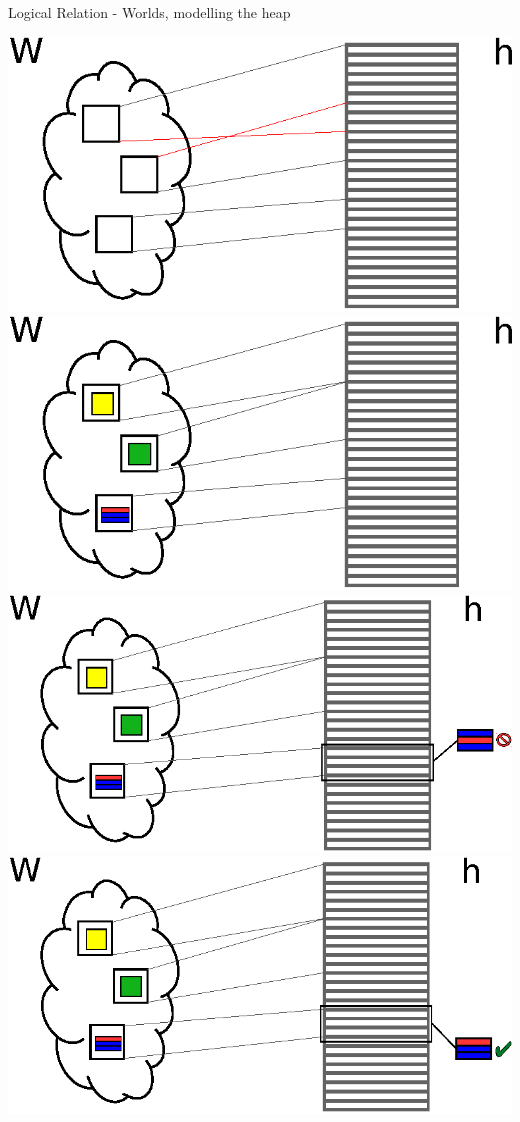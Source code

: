 \documentclass{beamer}
\begin{document}
\begin{frame}{Logical Relation - Worlds, modelling the heap}
\begin{overprint}
  \includegraphics{world4.eps}
  \includegraphics{world5.eps}
  \includegraphics{world6.eps}
  \includegraphics{world12.eps}

\end{overprint}
\end{frame}
\end{document}
